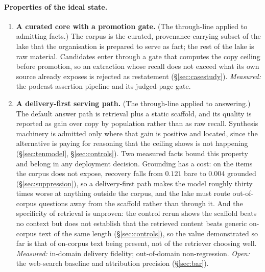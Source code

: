 \documentclass[10pt,twocolumn]{article}
\begin{document}
\paragraph{Properties of the ideal state.}
\begin{enumerate}[topsep=2pt,itemsep=3pt,leftmargin=2em,label=\textbf{D\arabic*}]
\item \textbf{A curated core with a promotion gate.} (The through-line applied to admitting facts.) The corpus is the curated, provenance-carrying subset of the lake that the organisation is prepared to serve as fact; the rest of the lake is raw material. Candidates enter through a gate that computes the copy ceiling before promotion, so an extraction whose recall does not exceed what its own source already exposes is rejected as restatement (\S\ref{sec:casestudy}). \emph{Measured:} the podcast assertion pipeline and its judged-page gate.
\item \textbf{A delivery-first serving path.} (The through-line applied to answering.) The default answer path is retrieval plus a static scaffold, and its quality is reported as gain over copy by population rather than as raw recall. Synthesis machinery is admitted only where that gain is positive and located, since the alternative is paying for reasoning that the ceiling shows is not happening (\S\ref{sec:tenmodel}, \S\ref{sec:controls}). Two measured facts bound this property and belong in any deployment decision. Grounding has a cost: on the items the corpus does not expose, recovery falls from $0.121$ bare to $0.004$ grounded (\S\ref{sec:suppression}), so a delivery-first path makes the model roughly thirty times worse at anything outside the corpus, and the lake must route out-of-corpus questions away from the scaffold rather than through it. And the specificity of retrieval is unproven: the control rerun shows the scaffold beats no context but does not establish that the retrieved content beats generic on-corpus text of the same length (\S\ref{sec:controls}), so the value demonstrated so far is that of on-corpus text being present, not of the retriever choosing well. \emph{Measured:} in-domain delivery fidelity; out-of-domain non-regression. \emph{Open:} the web-search baseline and attribution precision (\S\ref{sec:bar}).

\end{enumerate}
\end{document}
